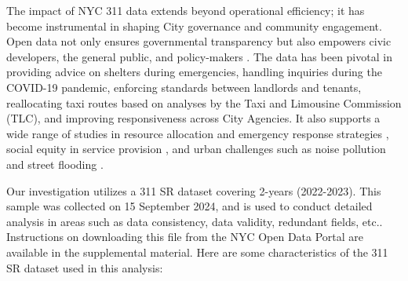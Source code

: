 \documentclass[linenumber]{jdsart}
\begin{document}
The impact of NYC 311 data extends beyond operational efficiency; it
has become instrumental in shaping City governance and community
engagement. Open data not only ensures governmental transparency
but also empowers civic developers, the general public, and
policy-makers \citep{minkoff2016nyc, o2017uncharted,
  kontokosta2021bias}.
The data has been pivotal in providing advice on shelters
during emergencies, handling inquiries during the COVID-19 pandemic,
enforcing standards between landlords and tenants, reallocating taxi
routes based on analyses by the Taxi and Limousine Commission (TLC),
and improving responsiveness across City Agencies.
It also supports a wide range of studies in resource allocation and
emergency response strategies \citep{zha2014profiling, raj2021swift},
social equity in service provision \citep{white2018promises,
  kontokosta2021bias}, and urban challenges such as noise pollution
\citep{dove2022sounds} and street flooding
\citep{agonafir2022understanding}.


Our investigation utilizes a 311 SR dataset covering  2-years (2022-2023).
This sample was collected on 15 September 2024, and is used 
to conduct detailed analysis in areas such as data 
consistency, data validity, redundant fields, etc.. Instructions 
on downloading this file from the NYC Open Data Portal 
are available in the supplemental material. Here are some 
characteristics of the 311 SR dataset used in this analysis:
\end{document}
